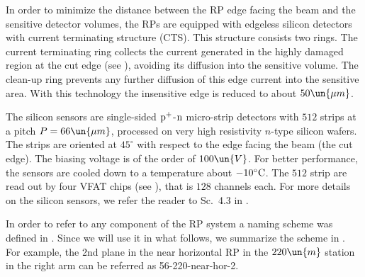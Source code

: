 \bmfig
{}
\emfig

\bmfig
{}
\emfig

\bmfig
{}
\hskip5mm
\emfig

In order to minimize the distance between the RP edge facing the beam and the sensitive detector volumes, the RPs are equipped with edgeless silicon detectors with current terminating structure (CTS). This structure consists two rings. The current terminating ring collects the current generated in the highly damaged region at the cut edge (see ), avoiding its diffusion into the sensitive volume. The clean-up ring prevents any further diffusion of this edge current into the sensitive area. With this technology the insensitive edge is reduced to about $50\un{\mu m}$.

The silicon sensors are single-sided $\rm p^+$-$\rm n$ micro-strip detectors with $512$ strips at a pitch $P = 66\un{\mu m}$, processed on very high resistivity
$n$-type silicon wafers. The strips are oriented at $45^\circ$ with respect to the edge facing the beam (the cut edge). The biasing voltage is of the order of $100\un{V}$. For better performance, the sensors are cooled down to a temperature about $-10^\circ\rm C$. The $512$ strip are read out by four VFAT chips (see ), that is $128$ channels each. For more details on the silicon sensors, we refer the reader to Sc.~4.3 in .

In order to refer to any component of the RP system a naming scheme was defined in . Since we will use it in what follows, we summarize the scheme in . For example, the 2nd plane in the near horizontal RP in the $220\un{m}$ station in the right arm can be referred as 56-220-near-hor-2.

